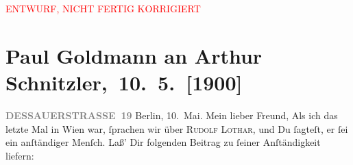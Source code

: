 
\begin{center}
            \textcolor{red}{ENTWURF, NICHT FERTIG KORRIGIERT}
                      \end{center}
            
         
         \newcommand{\erwaehntePersonen}{Personen: Moriz Benedikt, Rudolf Lothar}
         \newcommand{\erwaehnteInstitutionen}{Institutionen: Neue Freie Presse, Volkstheater}
         \newcommand{\erwaehnteOrte}{Orte: Berlin, Dessauer Straße, Deutsches Theater Berlin, Europa, Wien}
         \newcommand{\erwaehnteWerke}{Werke: König Harlekin. Maskenspiel in vier Aufzügen, Neue Freie Presse}
               \section[ Paul Goldmann an Arthur Schnitzler, 10. 5. {[}1900{]}]{ Paul Goldmann an Arthur Schnitzler, 10. 5. {[}1900{]}}\nopagebreak{}\rehead{ }\begin{ledgroupsized}[t]{13cm}\normalsize\beginnumbering \toendnotes[C]{\smallbreak\pagebreak[2]} 
\toendnotes[C]{\smallbreak}\pstart{}{\pb}\textcolor{gray}{\textbf{DESSAUERSTRASSE 19}}\pend{}{\bigskip}\pstart
           \raggedleft{}Berlin, 10. Mai.\pend
           \pstart\center{}Mein lieber Freund,\pend\pstart
           Als ich das letzte Mal in Wien war, ſprachen wir
               über \textsc{Rudolf Lothar}, und Du ſagteſt, er ſei ein anſtändiger Menſch. Laß’ Dir folgenden Beitrag zu
               ſeiner Anſtändigkeit liefern:\pend
           \pstart

\end{ledgroupsized}
